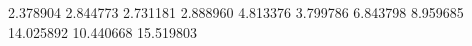2.378904
2.844773
2.731181
2.888960
4.813376
3.799786
6.843798
8.959685
14.025892
10.440668
15.519803
